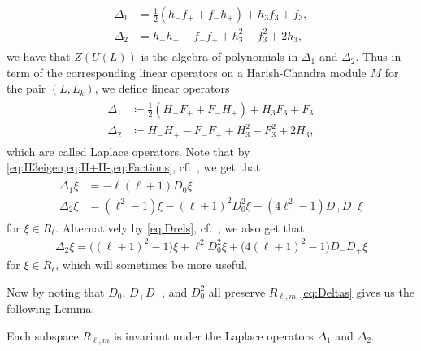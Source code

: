 \begin{align}\label{eq:DeltasaU(L)def}
  \begin{aligned}
  \Delta_1 &= \tfrac{1}{2}(h_-f_++f_-h_+)+h_3f_3+f_3, \\
  \Delta_2 &= h_-h_+ - f_-f_+ + h_3^2 - f_3^2 + 2h_3,
\end{aligned}

\end{align}
we have that $Z(U(L))$ is the algebra of polynomials in $\Delta_1$ and $\Delta_2$. Thus in term of the corresponding linear operators on a Harish-Chandra module $M$ for the pair $(L,L_k)$, we define linear operators
\begin{align}\label{eq:Deltasdef}
  \begin{aligned}
    \Delta_1 &\coloneqq \tfrac{1}{2}(H_-F_++F_-H_+) + H_3F_3 + F_3 \\
    \Delta_2 &\coloneqq H_-H_+ - F_-F_+ + H_3^2 - F_3^2 + 2H_3,
  \end{aligned}
\end{align}
which are called Laplace operators. Note that by \cref{eq:H3eigen,eq:H+H-,eq:Factions}, cf.\ , we get that
\begin{align}\label{eq:Deltas}
  \begin{aligned}
    \Delta_1 \xi &= -\ell(\ell+1)D_0\xi \\
    \Delta_2 \xi &= (\ell^2-1)\xi - (\ell+1)^2D_0^2\xi + (4\ell^2-1)D_+D_-\xi
  \end{aligned}                 
\end{align}
for $\xi\in R_\ell$. Alternatively by \cref{eq:Drels}, cf.\ , we also get that
\begin{align}\label{eq:altDelta2}
  \Delta_2 \xi = \bigl((\ell+1)^2-1\bigr)\xi  + \ell^2D_0^2\xi + \bigl(4(\ell+1)^2-1\bigr)D_-D_+\xi
\end{align}
for $\xi\in R_\ell$, which will sometimes be more useful.

Now by noting that $D_0$, $D_+D_-$, and $D_0^2$ all preserve $R_{\ell,m}$ \cref{eq:Deltas} gives us the following Lemma:
\begin{lemma}\label{lem:R_lmDeltainvariant}
  Each subspace $R_{\ell,m}$ is invariant under the Laplace operators $\Delta_1$ and $\Delta_2$. 
\end{lemma}

